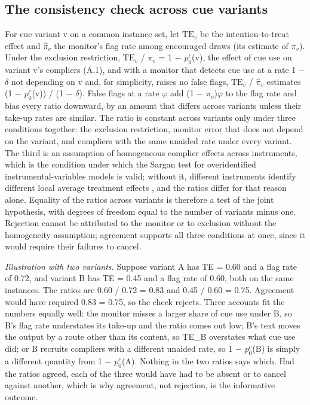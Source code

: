 \documentclass[11pt,a4paper]{article}
\begin{document}
\setcounter{subsection}{3}
\subsection{The consistency check across cue variants}
For cue variant v on a common instance set, let $\mathrm{TE}_v$ be the intention-to-treat effect and $\hat{\pi}_v$ the monitor’s flag rate among encouraged draws (its estimate of $\pi_v$). Under the exclusion restriction, $\mathrm{TE}_v$ / $\pi_v$ = 1 $-$ $p_0^{c}$(v), the effect of cue use on variant v’s compliers (A.1), and with a monitor that detects cue use at a rate 1 $-$ $\delta$ not depending on v and, for simplicity, raises no false flags, $\mathrm{TE}_v$ / $\hat{\pi}_v$ estimates (1 $-$ $p_0^{c}$(v)) / (1 $-$ $\delta$). False flags at a rate $\varphi$ add (1 $-$ $\pi_v$)$\varphi$ to the flag rate and bias every ratio downward, by an amount that differs across variants unless their take-up rates are similar. The ratio is constant across variants only under three conditions together: the exclusion restriction, monitor error that does not depend on the variant, and compliers with the same unaided rate under every variant. The third is an assumption of homogeneous complier effects across instruments, which is the condition under which the Sargan test for overidentified instrumental-variables models is valid; without it, different instruments identify different local average treatment effects \citep{imbens1994identification}, and the ratios differ for that reason alone. Equality of the ratios across variants is therefore a test of the joint hypothesis, with degrees of freedom equal to the number of variants minus one. Rejection cannot be attributed to the monitor or to exclusion without the homogeneity assumption; agreement supports all three conditions at once, since it would require their failures to cancel.

\emph{Illustration with two variants.} Suppose variant A has TE = 0.60 and a flag rate of 0.72, and variant B has TE = 0.45 and a flag rate of 0.60, both on the same instances. The ratios are 0.60 / 0.72 = 0.83 and 0.45 / 0.60 = 0.75. Agreement would have required 0.83 = 0.75, so the check rejects. Three accounts fit the numbers equally well: the monitor misses a larger share of cue use under B, so B's flag rate understates its take-up and the ratio comes out low; B's text moves the output by a route other than its content, so TE\_B overstates what cue use did; or B recruits compliers with a different unaided rate, so 1 $-$ $p_0^{c}$(B) is simply a different quantity from 1 $-$ $p_0^{c}$(A). Nothing in the two ratios says which. Had the ratios agreed, each of the three would have had to be absent or to cancel against another, which is why agreement, not rejection, is the informative outcome.
\end{document}
